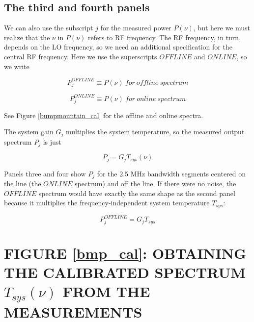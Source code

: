 
\subsection{The third and fourth panels}

	We can also use the subscript $j$ for the measured power
$P(\nu)$, but here we must realize that the $\nu$ in $P(\nu)$ refers to
RF frequency. The RF frequency, in turn, depends on the LO frequency, so
we need an additional specification for the central RF frequency. Here
we use the superscripts $OFFLINE$ and $ONLINE$, so we write

\begin{equation}
P_j^{OFFLINE} \equiv P(\nu) \ for \ offline \ spectrum
\end{equation}

\begin{equation}
P_j^{ONLINE} \equiv P(\nu) \ for \ online \ spectrum
\end{equation}

\noindent See Figure \ref{bumpmountain_cal} for the offline and online
spectra.

	The system gain $G_j$ multiplies the system temperature, so the
measured output spectrum $P_j$ is just

\begin{equation}
P_j = G_j T_{sys}(\nu)
\end{equation}

	Panels three and four show $P_j$ for the 2.5 MHz bandwidth segments
centered on the line (the $ONLINE$ spectrum) and off the line. If there
were no noise, the $OFFLINE$ spectrum would have exactly the same shape
as the second panel because it multiplies the frequency-independent system
temperature $T_{sys}$:

\begin{equation} \label{basiceqn} 
P_j^{OFFLINE} = G_j T_{sys} 
\end{equation}

\section{FIGURE \ref{bmp_cal}: OBTAINING THE CALIBRATED SPECTRUM
$T_{sys}(\nu)$ FROM THE MEASUREMENTS}

